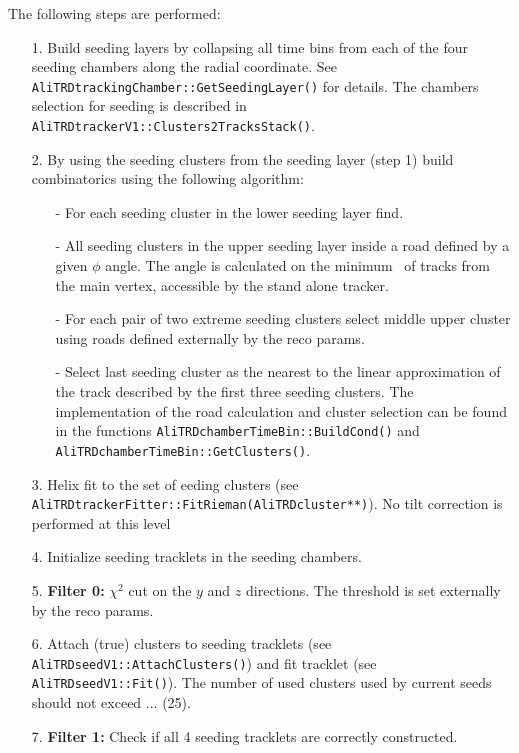 \documentclass{alicetdr}
\begin{document}
The following steps are performed:
\begin{itemize}
\item[1.] Build seeding layers by collapsing all time bins from each of the four
          seeding chambers along the radial coordinate. See
          {\tt AliTRDtrackingChamber::GetSeedingLayer()} for details. The chambers
          selection for seeding is described in
          {\tt AliTRDtrackerV1::Clusters2\-TracksStack()}.
\item[2.] By using the seeding clusters from the seeding layer (step 1) build
          combinatorics using the following algorithm:
  \begin{itemize}
  \item[-] For each seeding cluster in the lower seeding layer find.
  \item[-] All seeding clusters in the upper seeding layer inside a road defined by
           a given $\phi$ angle. The angle is calculated on the minimum \pt\ of tracks
           from the main vertex, accessible by the stand alone tracker.
  \item[-] For each pair of two extreme seeding clusters select middle upper cluster
           using roads defined externally by the reco params.
  \item[-] Select last seeding cluster as the nearest to the linear approximation of
           the track described by the first three seeding clusters. The implementation
           of the road calculation and cluster selection can be found in the functions
           {\tt AliTRDchamberTimeBin::Build\-Cond()} and
           {\tt AliTRDchamberTimeBin::GetClusters()}.
  \end{itemize}
\item[3.] Helix fit to the set of eeding clusters
          (see {\tt AliTRDtrackerFitter::FitRieman(AliTRD\-cluster**)}). No tilt
          correction is performed at this level
\item[4.] Initialize seeding tracklets in the seeding chambers.
\item[5.] {\bf Filter 0:} $\chi^{2}$ cut on the $y$ and $z$ directions. The threshold is
          set externally by the reco params.
\item[6.] Attach (true) clusters to seeding tracklets
          (see {\tt AliTRDseedV1::AttachClusters()}) and fit tracklet
          (see {\tt AliTRDseedV1::Fit()}). The number of used clusters used by current
          seeds should not exceed ... (25).
\item[7.] {\bf Filter 1:} Check if all 4 seeding tracklets are correctly constructed.

\end{itemize}
\end{document}
